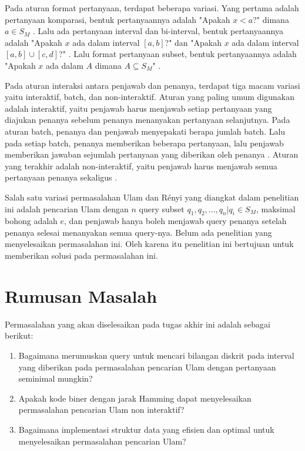 Pada aturan format pertanyaan, terdapat beberapa variasi. Yang pertama adalah pertanyaan komparasi, bentuk pertanyaannya adalah "Apakah $x<a$?" dimana $a \in S_M$ \cite{Innes} \cite{Auletta1992}. Lalu ada pertanyaan interval dan bi-interval, bentuk pertanyaannya adalah "Apakah $x$ ada dalam interval $[a,b]$?" \cite{Peter2017} dan "Apakah $x$ ada dalam interval $[a,b] \cup [c,d]$?" \cite{Mundici1997}. Lalu format pertanyaan subset, bentuk pertanyaannya adalah "Apakah $x$ ada dalam $A$ dimana $A \subseteq S_M$" \cite{Katona} \cite{Macula1997}.

Pada aturan interaksi antara penjawab dan penanya, terdapat tiga macam variasi yaitu interaktif, batch, dan non-interaktif. Aturan yang paling umum digunakan adalah interaktif, yaitu penjawab harus menjawab setiap pertanyaan yang diajukan penanya sebelum penanya menanyakan pertanyaan selanjutnya. Pada aturan batch, penanya dan penjawab menyepakati berapa jumlah batch. Lalu pada setiap batch, penanya memberikan beberapa pertanyaan, lalu penjawab memberikan jawaban sejumlah pertanyaan yang diberikan oleh penanya \cite{Cicalese2000}. Aturan yang terakhir adalah non-interaktif, yaitu penjawab harus menjawab semua pertanyaan penanya sekaligus \cite{Macula1997}.

Salah satu variasi permasalahan Ulam dan Rényi yang diangkat dalam penelitian ini adalah pencarian Ulam dengan $n$ query subset ${q_1,q_2,\ldots,q_n} | q_i \in S_M$, maksimal bohong adalah $e$, dan penjawab hanya boleh menjawab query penanya setelah penanya selesai menanyakan semua query-nya. Belum ada penelitian yang menyelesaikan permasalahan ini. Oleh karena itu penelitian ini bertujuan untuk memberikan solusi pada permasalahan ini.


\section {Rumusan Masalah}
Permasalahan yang akan diselesaikan pada tugas akhir ini adalah sebagai berikut:

\begin {enumerate}
  \item Bagaimana merumuskan query untuk mencari bilangan diskrit pada interval yang diberikan pada permasalahan pencarian Ulam dengan pertanyaan seminimal mungkin?
  \item Apakah kode biner dengan jarak Hamming dapat menyelesaikan permasalahan pencarian Ulam non interaktif?
  \item Bagaimana implementasi struktur data yang efisien dan optimal untuk menyelesaikan permasalahan pencarian Ulam?
\end {enumerate}


